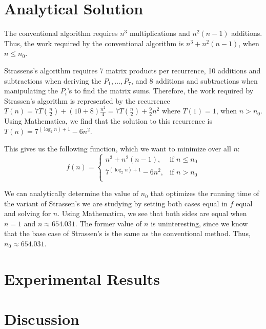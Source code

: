\documentclass[solution, letterpaper]{cs121}
\begin{document}

\section*{Analytical Solution}

The conventional algorithm requires $n^3$ multiplications and $n^2(n-1)$ additions. Thus, the work required by the conventional algorithm is $n^3 + n^2(n-1)$, when $n \leq n_0$.

Strassens's algorithm requires 7 matrix products per recurrence, 10 additions and subtractions when deriving the $P_1, \ldots, P_7$, and 8 additions and subtractions when manipulating the $P_i$'s to find the matrix sums. Therefore, the work required by Strassen's algorithm is represented by the recurrence $T(n) = 7T(\frac{n}{2}) + (10+8)\frac{n^2}{4} = 7T(\frac{n}{2}) + \frac{9}{2}n^2$ where $T(1) = 1$, when $n > n_0$. Using Mathematica, we find that the solution to this recurrence is $T(n) = 7^{(\log_2 n) + 1}-6 n^2$.

This gives us the following function, which we want to minimize over all $n$:
\[
    f(n)= 
\begin{cases}
    n^3 + n^2(n-1), & \text{if } n \leq n_0\\
    7^{(\log_2 n) + 1}-6 n^2, & \text{if } n > n_0 \\
\end{cases}
\]

We can analytically determine the value of $n_0$ that optimizes the running time of the variant of Strassen's we are studying by setting both cases equal in $f$ equal and solving for $n$. Using Mathematica, we see that both sides are equal when $n = 1$ and $n \approx 654.031$. The former value of $n$ is uninteresting, since we know that the base case of Strassen's is the same as the conventional method. Thus, $n_0 \approx 654.031$.

\section*{Experimental Results}

\section*{Discussion}
\end{document}

